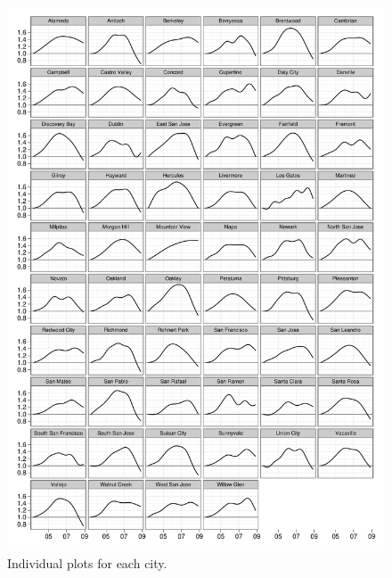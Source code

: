 \documentclass[oneside]{article}
\begin{document}
\begin{figure}[htbp]
  \centering
  \includegraphics[width=0.9\linewidth]{cities-individual}
  \caption{Individual plots for each city.}
  \label{fig:individual}
\end{figure}

% 
% 
\end{document}
